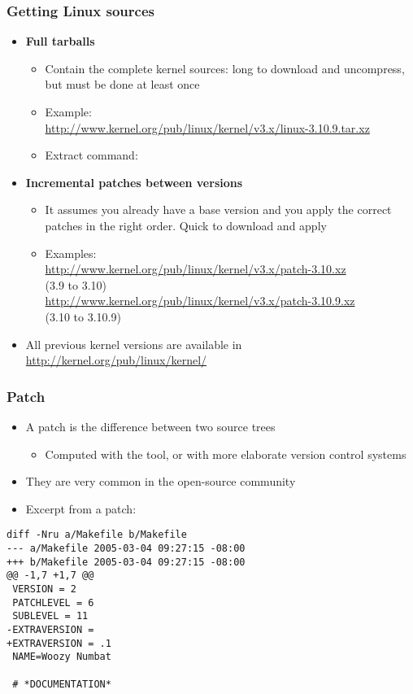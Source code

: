 \begin{frame}
  \frametitle{Getting Linux sources}
  \begin{itemize}
  \item {\bf Full tarballs}
    \begin{itemize}
    \item Contain the complete kernel sources: long to download and
      uncompress, but must be done at least once
    \item Example:\\
      \footnotesize
      \url{http://www.kernel.org/pub/linux/kernel/v3.x/linux-3.10.9.tar.xz}
      \normalsize
    \item Extract command:\\
      \footnotesize
      \normalsize
    \end{itemize}
  \item {\bf Incremental patches between versions}
    \begin{itemize}
    \item It assumes you already have a base version and you apply the
      correct patches in the right order. Quick to download and apply
    \item Examples:\\
      \scriptsize
      \url{http://www.kernel.org/pub/linux/kernel/v3.x/patch-3.10.xz}\\(3.9 to 3.10)\\
      \url{http://www.kernel.org/pub/linux/kernel/v3.x/patch-3.10.9.xz}\\(3.10 to 3.10.9)
    \end{itemize}
  \item All previous kernel versions are available in
    \url{http://kernel.org/pub/linux/kernel/}
  \end{itemize}
\end{frame}

\begin{frame}[fragile]
  \frametitle{Patch}
  \begin{itemize}
  \item A patch is the difference between two source trees
    \begin{itemize}
    \item Computed with the  tool, or with more elaborate
      version control systems
    \end{itemize}
  \item They are very common in the open-source community
  \item Excerpt from a patch:
  \end{itemize}
\footnotesize
\begin{verbatim}
diff -Nru a/Makefile b/Makefile
--- a/Makefile 2005-03-04 09:27:15 -08:00
+++ b/Makefile 2005-03-04 09:27:15 -08:00
@@ -1,7 +1,7 @@
 VERSION = 2
 PATCHLEVEL = 6
 SUBLEVEL = 11
-EXTRAVERSION =
+EXTRAVERSION = .1
 NAME=Woozy Numbat

 # *DOCUMENTATION*
\end{verbatim}
\end{frame}

